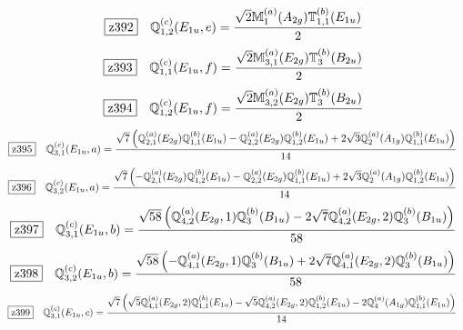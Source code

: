 \documentclass[fleqn,10pt,landscape]{jsarticle}
\begin{document}
\begin{dmath*}
\hspace*{3mm}\fbox{z392}\quad \mathbb{Q}_{1,2}^{(c)}(E_{1u},e)=\frac{\sqrt{2} \mathbb{M}_{1}^{(a)}(A_{2g}) \mathbb{T}_{1,1}^{(b)}(E_{1u})}{2}
\end{dmath*}
\begin{dmath*}
\hspace*{3mm}\fbox{z393}\quad \mathbb{Q}_{1,1}^{(c)}(E_{1u},f)=\frac{\sqrt{2} \mathbb{M}_{3,1}^{(a)}(E_{2g}) \mathbb{T}_{3}^{(b)}(B_{2u})}{2}
\end{dmath*}
\begin{dmath*}
\hspace*{3mm}\fbox{z394}\quad \mathbb{Q}_{1,2}^{(c)}(E_{1u},f)=\frac{\sqrt{2} \mathbb{M}_{3,2}^{(a)}(E_{2g}) \mathbb{T}_{3}^{(b)}(B_{2u})}{2}
\end{dmath*}
\begin{dmath*}
\hspace*{3mm}\fbox{z395}\quad \mathbb{Q}_{3,1}^{(c)}(E_{1u},a)=\frac{\sqrt{7} \left(\mathbb{Q}_{2,1}^{(a)}(E_{2g}) \mathbb{Q}_{1,1}^{(b)}(E_{1u}) - \mathbb{Q}_{2,2}^{(a)}(E_{2g}) \mathbb{Q}_{1,2}^{(b)}(E_{1u}) + 2 \sqrt{3} \mathbb{Q}_{2}^{(a)}(A_{1g}) \mathbb{Q}_{1,1}^{(b)}(E_{1u})\right)}{14}
\end{dmath*}
\begin{dmath*}
\hspace*{3mm}\fbox{z396}\quad \mathbb{Q}_{3,2}^{(c)}(E_{1u},a)=\frac{\sqrt{7} \left(- \mathbb{Q}_{2,1}^{(a)}(E_{2g}) \mathbb{Q}_{1,2}^{(b)}(E_{1u}) - \mathbb{Q}_{2,2}^{(a)}(E_{2g}) \mathbb{Q}_{1,1}^{(b)}(E_{1u}) + 2 \sqrt{3} \mathbb{Q}_{2}^{(a)}(A_{1g}) \mathbb{Q}_{1,2}^{(b)}(E_{1u})\right)}{14}
\end{dmath*}
\begin{dmath*}
\hspace*{3mm}\fbox{z397}\quad \mathbb{Q}_{3,1}^{(c)}(E_{1u},b)=\frac{\sqrt{58} \left(\mathbb{Q}_{4,2}^{(a)}(E_{2g},1) \mathbb{Q}_{3}^{(b)}(B_{1u}) - 2 \sqrt{7} \mathbb{Q}_{4,2}^{(a)}(E_{2g},2) \mathbb{Q}_{3}^{(b)}(B_{1u})\right)}{58}
\end{dmath*}
\begin{dmath*}
\hspace*{3mm}\fbox{z398}\quad \mathbb{Q}_{3,2}^{(c)}(E_{1u},b)=\frac{\sqrt{58} \left(- \mathbb{Q}_{4,1}^{(a)}(E_{2g},1) \mathbb{Q}_{3}^{(b)}(B_{1u}) + 2 \sqrt{7} \mathbb{Q}_{4,1}^{(a)}(E_{2g},2) \mathbb{Q}_{3}^{(b)}(B_{1u})\right)}{58}
\end{dmath*}
\begin{dmath*}
\hspace*{3mm}\fbox{z399}\quad \mathbb{Q}_{3,1}^{(c)}(E_{1u},c)=\frac{\sqrt{7} \left(\sqrt{5} \mathbb{Q}_{4,1}^{(a)}(E_{2g},2) \mathbb{Q}_{1,1}^{(b)}(E_{1u}) - \sqrt{5} \mathbb{Q}_{4,2}^{(a)}(E_{2g},2) \mathbb{Q}_{1,2}^{(b)}(E_{1u}) - 2 \mathbb{Q}_{4}^{(a)}(A_{1g}) \mathbb{Q}_{1,1}^{(b)}(E_{1u})\right)}{14}
\end{dmath*}
\end{document}
